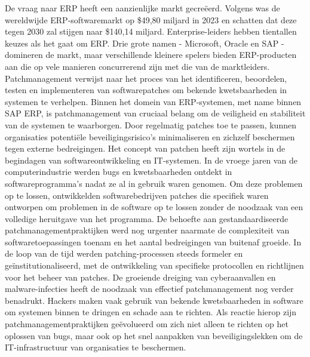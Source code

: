 De vraag naar ERP heeft een aanzienlijke markt gecreëerd. Volgens \textcite{Madh2024} was de wereldwijde ERP-softwaremarkt op \$49,80 miljard in 2023 en schatten dat deze tegen 2030 zal stijgen naar \$140,14 miljard.
Enterprise-leiders hebben tientallen keuzes als het gaat om ERP. Drie grote namen - Microsoft, Oracle en SAP - domineren de markt, maar verschillende kleinere spelers bieden ERP-producten aan die op vele manieren concurrerend zijn met die van de marktleiders. \autocite{Pratt2023}
Patchmanagement verwijst naar het proces van het identificeren, beoordelen, testen en implementeren van softwarepatches om bekende kwetsbaarheden in systemen te verhelpen. 
Binnen het domein van ERP-systemen, met name binnen SAP ERP, is patchmanagement van cruciaal belang om de veiligheid en stabiliteit van de systemen te waarborgen. Door regelmatig patches toe te passen, kunnen organisaties potentiële beveiligingsrisico's minimaliseren en zichzelf beschermen tegen externe bedreigingen.
Het concept van patchen heeft zijn wortels in de begindagen van softwareontwikkeling en IT-systemen. In de vroege jaren van de computerindustrie werden bugs en kwetsbaarheden ontdekt in softwareprogramma's nadat ze al in gebruik waren genomen. Om deze problemen op te lossen, ontwikkelden softwarebedrijven patches die specifiek waren ontworpen om problemen in de software op te lossen zonder de noodzaak van een volledige heruitgave van het programma. \autocite{Buenning2024}
De behoefte aan gestandaardiseerde patchmanagementpraktijken werd nog urgenter naarmate de complexiteit van softwaretoepassingen toenam en het aantal bedreigingen van buitenaf groeide. In de loop van de tijd werden patching-processen steeds formeler en geïnstitutionaliseerd, met de ontwikkeling van specifieke protocollen en richtlijnen voor het beheer van patches. 
De groeiende dreiging van cyberaanvallen en malware-infecties heeft de noodzaak van effectief patchmanagement nog verder benadrukt. Hackers maken vaak gebruik van bekende kwetsbaarheden in software om systemen binnen te dringen en schade aan te richten. Als reactie hierop zijn patchmanagementpraktijken geëvolueerd om zich niet alleen te richten op het oplossen van bugs, maar ook op het snel aanpakken van beveiligingslekken om de IT-infrastructuur van organisaties te beschermen.

